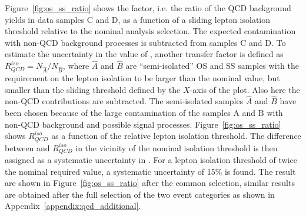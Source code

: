 Figure~\ref{fig:os_ss_ratio} shows the \rqcd factor, i.e. the ratio of the QCD background 
yields in data samples C and D, as a function of a sliding lepton isolation threshold relative to the 
nominal analysis selection.
The expected contamination with  non-QCD background processes is subtracted from  samples C and D.
To estimate the uncertainty in the value of \rqcd,  another transfer factor is defined as $R_{QCD}^{iso}  = N_{\hat{A}} / N_{\hat{B}}$,
where  $\hat{A}$ and $\hat{B}$  are ``semi-isolated'' OS and SS samples with  the requirement on  the lepton isolation to be  larger 
than the nominal value, 
but smaller than the sliding threshold defined by the $X$-axis of the plot. Also here the non-QCD contributions are subtracted.
The semi-isolated samples $\hat{A}$ and $\hat{B}$ have been chosen  
because of the large contamination of the samples A and B with non-QCD background and  possible signal processes. 
Figure~\ref{fig:os_ss_ratio} shows $R_{QCD}^{iso}$ as a function of the relative lepton isolation threshold.
The difference between \rqcd and $R_{QCD}^{iso} $ in the vicinity of the nominal isolation threshold
is then assigned as a systematic uncertainty in \rqcd. For a lepton isolation threshold of 
twice the nominal required value, a systematic uncertainty of 15\% is found.
The result are shown  in Figure~\ref{fig:os_ss_ratio} after the common selection, similar results are obtained after the full 
selection of the two event categories as shown in Appendix~\ref{appendix:qcd_additional}.


